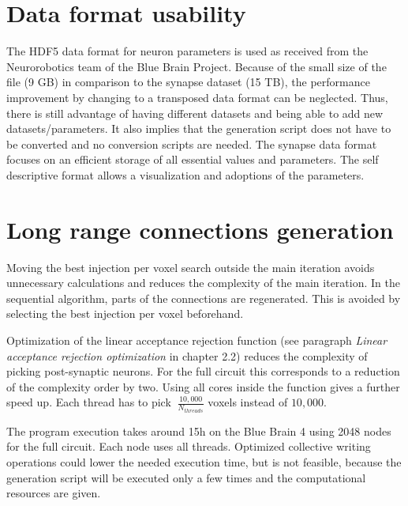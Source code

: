 \section{Data format usability}
The HDF5 data format for neuron parameters is used as received from the Neurorobotics team of the Blue Brain Project.
Because of the small size of the file (9 GB) in comparison to the synapse dataset (15 TB), the performance improvement by changing
to a transposed data format can be neglected. Thus, there is still advantage of having different datasets and being able
to add new datasets/parameters. It also implies that the generation script does not have to be converted and no 
conversion scripts are needed. The synapse data format focuses on an efficient storage of all essential values and parameters.
The self descriptive format allows a visualization and adoptions of the parameters.

\section{Long range connections generation}
Moving the best injection per voxel search outside the main iteration
avoids unnecessary calculations and reduces the complexity of the main iteration.
In the sequential algorithm, parts of the connections are regenerated.
This is avoided by selecting the best injection per voxel beforehand.

Optimization of the linear acceptance rejection function (see paragraph \emph{Linear acceptance rejection optimization} in chapter 2.2)
reduces the complexity of picking post-synaptic neurons.
For the full circuit this corresponds to a reduction of the complexity order  by two.
Using all cores inside the function gives a further speed up.
Each thread has to pick $~\frac{10,000}{N_{threads}}$ voxels instead of
$10,000$.

The program execution takes around 15h on the Blue Brain 4 using 2048 nodes for the full circuit.
Each node uses all threads. Optimized collective writing operations could 
lower the needed execution time,
but is not feasible, because the generation script will be executed only a few times
and the computational resources are given.

